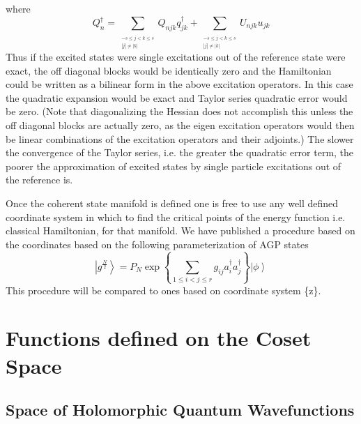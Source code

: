 \documentclass[aps,preprint]{revtex4}%
\begin{document}
where
\begin{equation}
Q_{n}^{\dagger}=\sum\limits_{_{\substack{-s\leq j<k\leq s\\\left\vert
j\right\vert \neq\left\vert k\right\vert }}}Q_{njk}q_{jk}^{\dagger}%
+\sum\limits_{_{\substack{-s\leq j<k\leq s\\\left\vert j\right\vert
\neq\left\vert k\right\vert }}}U_{njk}u_{jk}%
\end{equation}
Thus if the excited states were single excitations out of the reference state
were exact, the off diagonal blocks would be identically zero and the
Hamiltonian could be written as a bilinear form in the above excitation
operators. In this case the quadratic expansion would be exact and Taylor
series quadratic error would be zero. (Note that diagonalizing the Hessian
does not accomplish this unless the off diagonal blocks are actually zero, as
the eigen excitation operators would then be linear combinations of the
excitation operators and their adjoints.) The slower the convergence of the
Taylor series, i.e. the greater the quadratic error term, the poorer the
approximation of excited states by single particle excitations out of the
reference is.

Once the coherent state manifold is defined one is free to use any well
defined coordinate system in which to find the critical points of the energy
function i.e. classical Hamiltonian, for that manifold. We have published a
procedure based on the coordinates based on the following parameterization of
AGP states%
\begin{equation}
\left\vert g^{\frac{N}{2}}\right\rangle =P_{N}\exp\left\{  \sum_{1\leq i<j\leq
r}g_{ij}a_{i}^{\dagger}a_{j}^{\dagger}\right\}  \left\vert \phi\right\rangle
\end{equation}
This procedure will be compared to ones based on coordinate system \{z\}.

\section{Functions defined on the Coset Space}

\subsection{Space of Holomorphic Quantum Wavefunctions}
\end{document}
